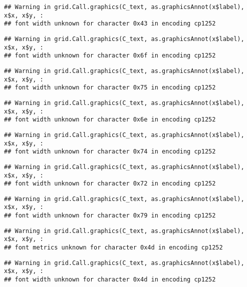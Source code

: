 \documentclass[
]{article}
\begin{document}
\begin{verbatim}
## Warning in grid.Call.graphics(C_text, as.graphicsAnnot(x$label), x$x, x$y, :
## font width unknown for character 0x43 in encoding cp1252
\end{verbatim}

\begin{verbatim}
## Warning in grid.Call.graphics(C_text, as.graphicsAnnot(x$label), x$x, x$y, :
## font width unknown for character 0x6f in encoding cp1252
\end{verbatim}

\begin{verbatim}
## Warning in grid.Call.graphics(C_text, as.graphicsAnnot(x$label), x$x, x$y, :
## font width unknown for character 0x75 in encoding cp1252
\end{verbatim}

\begin{verbatim}
## Warning in grid.Call.graphics(C_text, as.graphicsAnnot(x$label), x$x, x$y, :
## font width unknown for character 0x6e in encoding cp1252
\end{verbatim}

\begin{verbatim}
## Warning in grid.Call.graphics(C_text, as.graphicsAnnot(x$label), x$x, x$y, :
## font width unknown for character 0x74 in encoding cp1252
\end{verbatim}

\begin{verbatim}
## Warning in grid.Call.graphics(C_text, as.graphicsAnnot(x$label), x$x, x$y, :
## font width unknown for character 0x72 in encoding cp1252
\end{verbatim}

\begin{verbatim}
## Warning in grid.Call.graphics(C_text, as.graphicsAnnot(x$label), x$x, x$y, :
## font width unknown for character 0x79 in encoding cp1252
\end{verbatim}

\begin{verbatim}
## Warning in grid.Call.graphics(C_text, as.graphicsAnnot(x$label), x$x, x$y, :
## font metrics unknown for character 0x4d in encoding cp1252
\end{verbatim}

\begin{verbatim}
## Warning in grid.Call.graphics(C_text, as.graphicsAnnot(x$label), x$x, x$y, :
## font width unknown for character 0x4d in encoding cp1252
\end{verbatim}
\end{document}
